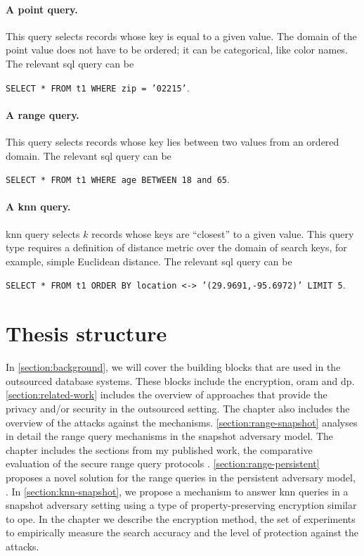 			\paragraph*{A point query.}
				This query selects records whose key is equal to a given value.
				The domain of the point value does not have to be ordered; it can be categorical, like color names.
				The relevant \acrshort{sql} query can be

				\texttt{SELECT * FROM t1 WHERE zip = '02215'}.

			\paragraph*{A range query.}
				This query selects records whose key lies between two values from an ordered domain.
				The relevant \acrshort{sql} query can be

				\texttt{SELECT * FROM t1 WHERE age BETWEEN 18 and 65}.

			\paragraph*{A \acrshort{knn} query.}
				\acrlong{knn} query selects $k$ records whose keys are ``closest'' to a given value.
				This query type requires a definition of distance metric over the domain of search keys, for example, simple Euclidean distance.
				The relevant \acrshort{sql} query can be

				\texttt{SELECT * FROM t1 ORDER BY location <-> '(29.9691,-95.6972)' LIMIT 5}. %

	\section{Thesis structure}

		In \cref{section:background}, we will cover the building blocks that are used in the outsourced database systems.
		These blocks include the encryption, \acrshort{oram} and \acrlong{dp}.
		\cref{section:related-work} includes the overview of approaches that provide the privacy and/or security in the outsourced setting.
		The chapter also includes the overview of the attacks against the mechanisms.
		\cref{section:range-snapshot} analyses in detail the range query mechanisms in the snapshot adversary model.
		The chapter includes the sections from my published work, the comparative evaluation of the secure range query protocols \cite{ore-benchmark-17}.
		\cref{section:range-persistent} proposes a novel solution for the range queries in the persistent adversary model, \epsolute{} \cite{ore-benchmark-17}.
		In \cref{section:knn-snapshot}, we propose a mechanism to answer \acrlong{knn} queries in a snapshot adversary setting using a type of property-preserving encryption similar to \acrshort{ope}.
		In the chapter we describe the encryption method, the set of experiments to empirically measure the search accuracy and the level of protection against the attacks.

